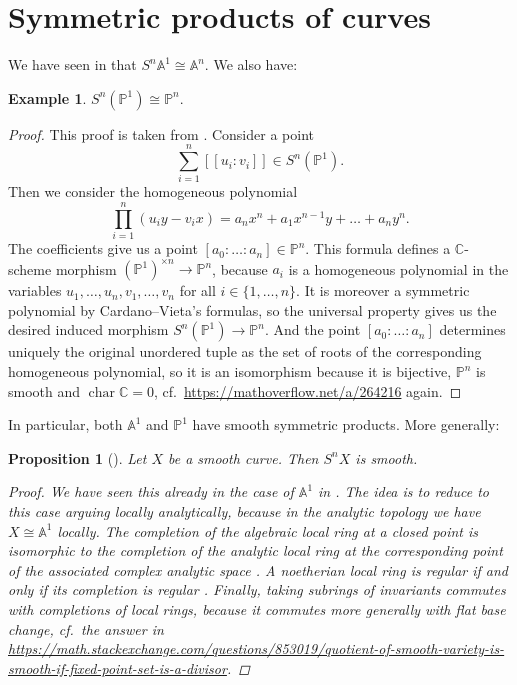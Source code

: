 \documentclass[12pt,a4paper]{amsart}
\theoremstyle{plain}
\newtheorem{prop}[thm]{Proposition}
\theoremstyle{definition}
\newtheorem{exmp}[thm]{Example}
\theoremstyle{remark}
\begin{document}
\section{Symmetric products of curves}

We have seen in  that $S^{n}\mathbb{A}^{1} \cong \mathbb{A}^{n}$.
We also have:

\begin{exmp}\label{exmp:projectiveline}
  $S^{n}(\mathbb{P}^{1}) \cong \mathbb{P}^{n}$.

  \begin{proof}
    This proof is taken from \cite[Example 3.4]{rot16}.
    Consider a point
    \[ \sum_{i = 1}^{n} [[u_{i}:v_{i}]] \in S^{n}(\mathbb{P}^{1}). \]
    Then we consider the homogeneous polynomial
    \[ \prod_{i = 1}^{n} (u_{i}y - v_{i}x) = a_{n} x^{n} + a_{1} x^{n-1}y + \ldots + a_{n}y^{n}. \]
    The coefficients give us a point $[a_{0} : \ldots : a_{n} ] \in \mathbb{P}^{n}$.
    This formula defines a $\mathbb{C}$-scheme morphism $(\mathbb{P}^{1})^{\times n} \to \mathbb{P}^{n}$, because $a_{i}$ is a homogeneous polynomial in the variables $u_{1}, \ldots, u_{n}, v_{1}, \ldots, v_{n}$ for all $i \in \{ 1 , \ldots, n\}$.
    It is moreover a symmetric polynomial by Cardano--Vieta's formulas, so the universal property gives us the desired induced morphism $S^{n}(\mathbb{P}^{1}) \to \mathbb{P}^{n}$.
    And the point $[a_{0} : \ldots : a_{n}]$ determines uniquely the original unordered tuple as the set of roots of the corresponding homogeneous polynomial, so it is an isomorphism because it is bijective, $\mathbb{P}^{n}$ is smooth and $\operatorname{char}{\mathbb{C}} = 0$, cf.~\url{https://mathoverflow.net/a/264216} again.
  \end{proof}
\end{exmp}

In particular, both $\mathbb{A}^{1}$ and $\mathbb{P}^{1}$ have smooth symmetric products.
More generally:

\begin{prop}[{\cite[Proposition 3.1]{rot16}}]\label{prop:curves}
  Let $X$ be a smooth curve.
  Then $S^{n}X$ is smooth.

  \begin{proof}
    We have seen this already in the case of $\mathbb{A}^{1}$ in .
    The idea is to reduce to this case arguing locally analytically, because in the analytic topology we have $X \cong \mathbb{A}^{1}$ locally.
    The completion of the algebraic local ring at a closed point is isomorphic to the completion of the analytic local ring at the corresponding point of the associated complex analytic space \cite[Proposition 3]{ser56}.
    A noetherian local ring is regular if and only if its completion is regular \cite[\href{https://stacks.math.columbia.edu/tag/07NY}{Tag 07NY}]{stacks-project}.
    Finally, taking subrings of invariants commutes with completions of local rings, because it commutes more generally with flat base change, cf.~the answer in \url{https://math.stackexchange.com/questions/853019/quotient-of-smooth-variety-is-smooth-if-fixed-point-set-is-a-divisor}.
  \end{proof}
\end{prop}
\end{document}
